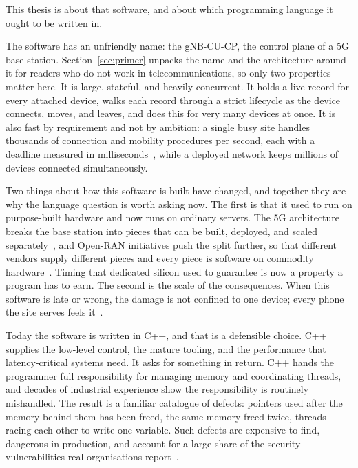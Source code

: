 \documentclass[english,twoside,openright,a4paper,censored,csm,software-track-2020]{HYthesisML}
\begin{document}
This thesis is about that software, and about which programming language it ought to be
written in.

The software has an unfriendly name: the gNB-CU-CP, the control plane of a 5G base station.
Section~\ref{sec:primer} unpacks the name and the architecture around it for readers who do
not work in telecommunications, so only two properties matter here. It is large, stateful,
and heavily concurrent. It holds a live record for every attached device, walks each record
through a strict lifecycle as the device connects, moves, and leaves, and does this for very
many devices at once. It is also fast by requirement and not by ambition: a single busy site
handles thousands of connection and mobility procedures per second, each with a deadline
measured in milliseconds~\cite{3gpp22261}, while a deployed network keeps millions of devices
connected simultaneously.

Two things about how this software is built have changed, and together they are why the
language question is worth asking now. The first is that it used to run on purpose-built
hardware and now runs on ordinary servers. The 5G architecture breaks the base station into
pieces that can be built, deployed, and scaled separately~\cite{3gpp38401,3gpp38300}, and
Open-RAN initiatives push the split further, so that different vendors supply different
pieces and every piece is software on commodity hardware~\cite{polese2023oran}. Timing that
dedicated silicon used to guarantee is now a property a program has to earn. The second is
the scale of the consequences. When this software is late or wrong, the damage is not
confined to one device; every phone the site serves
feels it~\cite{dean2013tail,barroso2017microseconds}.

Today the software is written in C++, and that is a defensible choice. C++ supplies the
low-level control, the mature tooling, and the performance that latency-critical systems
need. It asks for something in return. C++ hands the programmer full responsibility for
managing memory and coordinating threads, and decades of industrial experience show the
responsibility is routinely mishandled. The result is a familiar catalogue of defects:
pointers used after the memory behind them has been freed, the same memory freed twice,
threads racing each other to write one variable. Such defects are expensive to find,
dangerous in production, and account for a large share of the security vulnerabilities real
organisations report~\cite{msrc2019memory,google2022android}.
\end{document}
